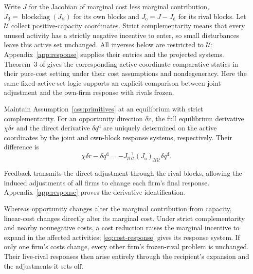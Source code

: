 Write $J$ for the Jacobian of marginal cost less marginal contribution,
$J_{\mathrm d}=\operatorname{blockdiag}(J_{ii})$ for its own blocks and
$J_{\mathrm o}=J-J_{\mathrm d}$ for its rival blocks.
Let $\mathcal U$ collect positive-capacity coordinates.
Strict complementarity means that every unused activity has a strictly
negative incentive to enter, so small disturbances leave this active
set unchanged.
All inverses below are restricted to $\mathcal U$;
Appendix~\ref{app:response} supplies their entries and the projected systems.
Theorem~3 of \citet{xu_zenou_zhou_conflict_2022} gives the corresponding
active-coordinate comparative statics in their pure-cost setting under their
cost assumptions and nondegeneracy.
Here the same fixed-active-set logic supports an explicit comparison between
joint adjustment and the own-firm response with rivals frozen.

\begin{proposition}\label{prop:response}
  Maintain Assumption~\ref{ass:primitives} at an equilibrium with strict
  complementarity.
  For an opportunity direction $\delta r$, the full equilibrium derivative
  $\chi\delta r$ and the direct derivative $\delta q^{\mathrm d}$ are uniquely
  determined on the active coordinates by the joint and own-block response
  systems, respectively.
  Their difference is
  \begin{equation}\label{eq:feedback}
    \chi\delta r-\delta q^{\mathrm d}
    =-J_{\mathcal U\mathcal U}^{-1}(J_{\mathrm o})_{\mathcal U\mathcal U}
    \delta q^{\mathrm d}.
  \end{equation}
\end{proposition}

Feedback transmits the direct adjustment through the rival blocks, allowing
the induced adjustments of all firms to change each firm's final response.
Appendix~\ref{app:response} proves the derivative identification.

Whereas opportunity changes alter the marginal contribution from capacity,
linear-cost changes directly alter its marginal cost.
Under strict complementarity and nearby nonnegative costs, a cost reduction
raises the marginal incentive to expand in the affected activities;
\eqref{eq:cost-response} gives its response system.
If only one firm's costs change, every other firm's frozen-rival
problem is unchanged.
Their live-rival responses then arise entirely through the recipient's
expansion and the adjustments it sets off.

